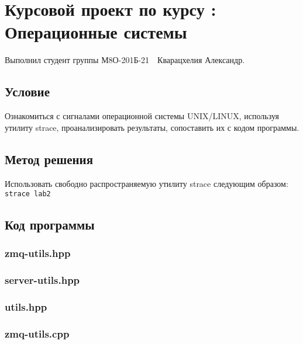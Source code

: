 \documentclass[12pt]{article}
\begin{document}
	
	\section*{\centering Курсовой проект по курсу :\\ Операционные системы}
	
	Выполнил студент группы М8О-201Б-21 \,\, Кварацхелия Александр.
	
	\subsection*{Условие}
	
	Ознакомиться с сигналами операционной системы UNIX/LINUX, используя утилиту strace, проанализировать результаты, сопоставить их с кодом программы.
	
	
	\subsection*{Метод решения}
	
	Использовать свободно распространяемую утилиту strace следующим образом: \\
	\lstinline[]|strace lab2|
	
	\subsection*{Код программы}
	
	\subsubsection*{zmq-utils.hpp}
	
	
	
	\subsubsection*{server-utils.hpp}
	
	
	
	\subsubsection*{utils.hpp}
	
	
	
	\subsubsection*{zmq-utils.cpp}
	
\end{document}
